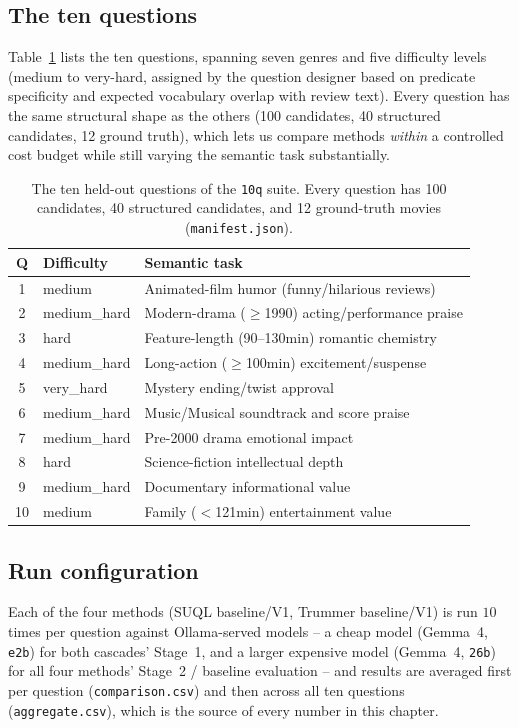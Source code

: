 \subsection{The ten questions}
Table~\ref{tab:10q-questions} lists the ten questions, spanning seven
genres and five difficulty levels (medium to very-hard, assigned by the
question designer based on predicate specificity and expected
vocabulary overlap with review text). Every question has the same
structural shape as the others (100 candidates, 40 structured
candidates, 12 ground truth), which lets us compare methods
\emph{within} a controlled cost budget while still varying the semantic
task substantially.

\begin{table}[h]
\centering\small
\begin{tabular}{clp{7.6cm}}
\toprule
Q & Difficulty & Semantic task \\
\midrule
1 & medium & Animated-film humor (funny/hilarious reviews) \\
2 & medium\_hard & Modern-drama ($\ge$1990) acting/performance praise \\
3 & hard & Feature-length (90--130min) romantic chemistry \\
4 & medium\_hard & Long-action ($\ge$100min) excitement/suspense \\
5 & very\_hard & Mystery ending/twist approval \\
6 & medium\_hard & Music/Musical soundtrack and score praise \\
7 & medium\_hard & Pre-2000 drama emotional impact \\
8 & hard & Science-fiction intellectual depth \\
9 & medium\_hard & Documentary informational value \\
10 & medium & Family ($<$121min) entertainment value \\
\bottomrule
\end{tabular}
\caption{The ten held-out questions of the \texttt{10q} suite. Every
question has 100 candidates, 40 structured candidates, and 12
ground-truth movies (\texttt{manifest.json}).}
\label{tab:10q-questions}
\end{table}

\subsection{Run configuration}
Each of the four methods (SUQL baseline/V1, Trummer baseline/V1) is run
$10$ times per question against Ollama-served models -- a cheap model
(Gemma~4, \texttt{e2b}) for both cascades' Stage~1, and a larger
expensive model (Gemma~4, \texttt{26b}) for all four methods' Stage~2 /
baseline evaluation -- and results are averaged first per question
(\texttt{comparison.csv}) and then across all ten questions
(\texttt{aggregate.csv}), which is the source of every number in this
chapter.

